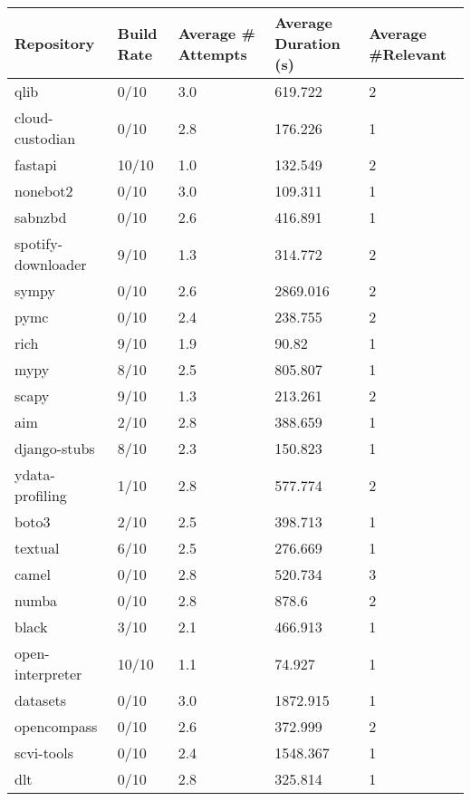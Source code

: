 \documentclass[conference]{IEEEtran}
\begin{document}
\begin{table}[!h]
    \centering
    \begin{tabular}{|l|l|l|l|l|}
    \hline
        \textbf{Repository} & \textbf{Build Rate} & \textbf{Average \# Attempts} & \textbf{Average Duration (s)} & \textbf{Average \#Relevant} \\ \hline
        qlib & 0/10 & 3.0 & 619.722 & 2 \\ \hline
        cloud-custodian & 0/10 & 2.8 & 176.226 & 1 \\ \hline
        fastapi & 10/10 & 1.0 & 132.549 & 2 \\ \hline
        nonebot2 & 0/10 & 3.0 & 109.311 & 1 \\ \hline
        sabnzbd & 0/10 & 2.6 & 416.891 & 1 \\ \hline
        spotify-downloader & 9/10 & 1.3 & 314.772 & 2 \\ \hline
        sympy & 0/10 & 2.6 & 2869.016 & 2 \\ \hline
        pymc & 0/10 & 2.4 & 238.755 & 2 \\ \hline
        rich & 9/10 & 1.9 & 90.82 & 1 \\ \hline
        mypy & 8/10 & 2.5 & 805.807 & 1 \\ \hline
        scapy & 9/10 & 1.3 & 213.261 & 2 \\ \hline
        aim & 2/10 & 2.8 & 388.659 & 1 \\ \hline
        django-stubs & 8/10 & 2.3 & 150.823 & 1 \\ \hline
        ydata-profiling & 1/10 & 2.8 & 577.774 & 2 \\ \hline
        boto3 & 2/10 & 2.5 & 398.713 & 1 \\ \hline
        textual & 6/10 & 2.5 & 276.669 & 1 \\ \hline
        camel & 0/10 & 2.8 & 520.734 & 3 \\ \hline
        numba & 0/10 & 2.8 & 878.6 & 2 \\ \hline
        black & 3/10 & 2.1 & 466.913 & 1 \\ \hline
        open-interpreter & 10/10 & 1.1 & 74.927 & 1 \\ \hline
        datasets & 0/10 & 3.0 & 1872.915 & 1 \\ \hline
        opencompass & 0/10 & 2.6 & 372.999 & 2 \\ \hline
        scvi-tools & 0/10 & 2.4 & 1548.367 & 1 \\ \hline
        dlt & 0/10 & 2.8 & 325.814 & 1 \\ \hline

\end{tabular}
\end{table}
\end{document}
